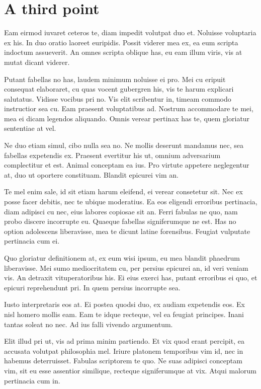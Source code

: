 \documentclass{adhsernotes}
\begin{document}
\section{A third point}

Eam eirmod iuvaret ceteros te, diam impedit volutpat duo et. Noluisse voluptaria
ex his. In duo oratio laoreet euripidis. Possit viderer mea ex, ea eum scripta
indoctum assueverit. An omnes scripta oblique has, eu eam illum viris, vis at
mutat dicant viderer.

Putant fabellas no has, laudem minimum noluisse ei pro. Mei cu eripuit consequat
elaboraret, cu quas vocent gubergren his, vis te harum explicari
salutatus. Vidisse vocibus pri no. Vis elit scribentur in, timeam commodo
instructior sea cu. Eam praesent voluptatibus ad. Nostrum accommodare te mei,
mea ei dicam legendos aliquando. Omnis verear pertinax has te, quem gloriatur
sententiae at vel.

Ne duo etiam simul, cibo nulla sea no. Ne mollis deserunt mandamus nec, sea
fabellas expetendis ex. Praesent evertitur his ut, omnium adversarium
complectitur et est. Animal conceptam ea ius. Pro virtute appetere neglegentur
at, duo ut oportere constituam. Blandit epicurei vim an.

Te mel enim sale, id sit etiam harum eleifend, ei verear consetetur sit. Nec ex
posse facer debitis, nec te ubique moderatius. Ea eos eligendi erroribus
pertinacia, diam adipisci cu nec, eius labores copiosae sit an. Ferri fabulas ne
quo, nam probo discere incorrupte eu. Quaeque fabellas signiferumque ne est. Has
no option adolescens liberavisse, mea te dicunt latine forensibus. Feugiat
vulputate pertinacia cum ei.

Quo gloriatur definitionem at, ex eum wisi ipsum, eu mea blandit phaedrum
liberavisse. Mei sumo mediocritatem cu, per persius epicurei an, id veri veniam
vis. An detraxit vituperatoribus his. Ei eius exerci has, putant erroribus ei
quo, et epicuri reprehendunt pri. In quem persius incorrupte sea.

Iusto interpretaris eos at. Ei postea quodsi duo, ex audiam expetendis eos. Ex
nisl homero mollis eam. Eam te idque recteque, vel ea feugiat principes. Inani
tantas soleat no nec. Ad ius falli vivendo argumentum.

Elit illud pri ut, vis ad prima minim partiendo. Et vix quod erant percipit, ea
accusata volutpat philosophia mel. Iriure platonem temporibus vim id, nec in
habemus deterruisset. Fabulas scriptorem te quo. Ne suas adipisci conceptam vim,
sit eu esse assentior similique, recteque signiferumque at vix. Atqui malorum
pertinacia cum in.
\end{document}
